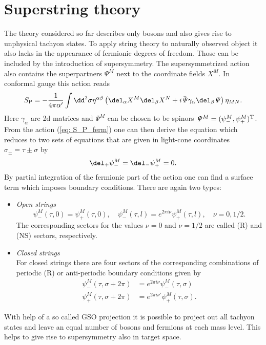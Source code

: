 \section{Superstring theory}
The theory considered so far describes only bosons and also gives rise to unphysical tachyon states. To apply string theory to naturally observed object it also lacks in the appearance of fermionic degrees of freedom. Those can be included by the introduction of supersymmetry. The supersymmetrized  action also contains the superpartners $\mathit{\Psi}^{M}$ next to the coordinate fields $X^{M}$. In conformal gauge this action reads
%
%
\begin{equation}
S_{\rm P} = -\frac{1}{4\pi\alpha'} \int \dd^{2}\sigma \eta^{\alpha\beta}\left( \del_{\alpha}X^{M}\del_{\beta}X^{N} + i \bar{\mathit{\Psi}} \gamma_{\alpha} \del_{\beta} \mathit{\Psi} \right) \eta_{MN}.
\label{eq: S_P_ferm}
\end{equation}
%
%
Here $\gamma_{\alpha}$ are 2d  matrices and $\mathit{\Psi}^{M}$ can be chosen to be  spinors $\mathit{\Psi}^{M}=(\psi_{-}^{M},\psi_{+}^{M})^{\rm T}$. From the action (\ref{eq: S_P_ferm}) one can then derive the  equation which reduces to two sets of  equations that are given in light-cone coordinates $\sigma_{\pm}=\tau \pm \sigma$ by
%
%
\begin{equation}
\del_{+}\psi_{-}^{M} = \del_{-}\psi_{+}^{M} = 0.
\end{equation}
%
%
By partial integration of the fermionic part of the action one can find a surface term which imposes boundary conditions. There are again two types:
%
%
\begin{itemize}
\item\textit{Open strings}
\begin{equation}
\psi_{-}^{M}(\tau,0)=\psi_{+}^{M}(\tau,0),\quad \psi_{-}^{M}(\tau,l)=e^{2\pi i \nu} \psi_{+}^{M}(\tau,l),\quad \nu=0,1/2.
\end{equation}
%
The corresponding sectors for the values $\nu=0$ and $\nu=1/2$ are called  (R) and  (NS) sectors, respectively.
%
%
\item\textit{Closed strings}\\
For closed strings there are four sectors of the corresponding combinations of periodic (R) or anti-periodic boundary conditions given by
%
\begin{equation}
\begin{alignedat}{2}
\psi_{-}^{M}(\tau,\sigma+2\pi) &= e^{2\pi i \nu}\psi_{-}^{M}(\tau,\sigma) \\
\psi_{+}^{M}(\tau,\sigma+2\pi) &= e^{2\pi i \nu'}\psi_{+}^{M}(\tau,\sigma) .
\end{alignedat}
\end{equation}
\end{itemize}
%
%
With help of a so called GSO projection it is possible to project out all tachyon states and leave an equal number of bosons and fermions at each mass level. This helps to give rise to supersymmetry also in target space.
%
%
%
%
%
%
%
%
